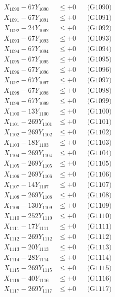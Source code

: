 \documentclass[a4paper,10pt]{article}
\begin{document}
{\begin{align}
X_{1090} - 67Y_{1090} &\leq +0 && \text{(G1090)} \\
\allowbreak
X_{1091} - 67Y_{1091} &\leq +0 && \text{(G1091)} \\
X_{1092} - 24Y_{1092} &\leq +0 && \text{(G1092)} \\
X_{1093} - 67Y_{1093} &\leq +0 && \text{(G1093)} \\
X_{1094} - 67Y_{1094} &\leq +0 && \text{(G1094)} \\
X_{1095} - 67Y_{1095} &\leq +0 && \text{(G1095)} \\
X_{1096} - 67Y_{1096} &\leq +0 && \text{(G1096)} \\
X_{1097} - 67Y_{1097} &\leq +0 && \text{(G1097)} \\
X_{1098} - 67Y_{1098} &\leq +0 && \text{(G1098)} \\
X_{1099} - 67Y_{1099} &\leq +0 && \text{(G1099)} \\
X_{1100} - 13Y_{1100} &\leq +0 && \text{(G1100)} \\
\allowbreak
X_{1101} - 269Y_{1101} &\leq +0 && \text{(G1101)} \\
X_{1102} - 269Y_{1102} &\leq +0 && \text{(G1102)} \\
X_{1103} - 18Y_{1103} &\leq +0 && \text{(G1103)} \\
X_{1104} - 269Y_{1104} &\leq +0 && \text{(G1104)} \\
X_{1105} - 269Y_{1105} &\leq +0 && \text{(G1105)} \\
X_{1106} - 269Y_{1106} &\leq +0 && \text{(G1106)} \\
X_{1107} - 14Y_{1107} &\leq +0 && \text{(G1107)} \\
X_{1108} - 269Y_{1108} &\leq +0 && \text{(G1108)} \\
X_{1109} - 130Y_{1109} &\leq +0 && \text{(G1109)} \\
X_{1110} - 252Y_{1110} &\leq +0 && \text{(G1110)} \\
\allowbreak
X_{1111} - 17Y_{1111} &\leq +0 && \text{(G1111)} \\
X_{1112} - 269Y_{1112} &\leq +0 && \text{(G1112)} \\
X_{1113} - 20Y_{1113} &\leq +0 && \text{(G1113)} \\
X_{1114} - 28Y_{1114} &\leq +0 && \text{(G1114)} \\
X_{1115} - 269Y_{1115} &\leq +0 && \text{(G1115)} \\
X_{1116} - 40Y_{1116} &\leq +0 && \text{(G1116)} \\
X_{1117} - 269Y_{1117} &\leq +0 && \text{(G1117)} \\

\end{align}}
\end{document}
